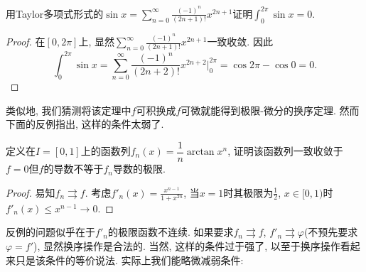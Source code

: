 \begin{example}
	用Taylor多项式形式的$\sin x = \sum_{n=0}^{\infty} \frac{(-1)^n}{(2n+1)!}x^{2n+1}$证明$\int_0^{2\pi} \sin x = 0$. 
\end{example}
\begin{proof}
	在$[0,2\pi]$上, 显然$\sum_{n=0}^{\infty} \frac{(-1)^n}{(2n+1)!}x^{2n+1}$一致收敛. 因此$$\int_0^{2\pi} \sin x = \sum_{n=0}^{\infty} \frac{(-1)^n}{(2n+2)!}x^{2n+2} \big|_0^{2\pi} = \cos 2\pi - \cos 0 = 0.$$
\end{proof}

类似地, 我们猜测将该定理中$f$可积换成$f$可微就能得到极限-微分的换序定理. 然而下面的反例指出, 这样的条件太弱了. 

\begin{example}
	定义在$I=[0,1]$上的函数列$f_n(x)=\dfrac{1}{n}\arctan x^n$, 证明该函数列一致收敛于$f=0$但$f$的导数不等于$f_n$导数的极限. 
\end{example}
\begin{proof}
	易知$f_n \rightrightarrows f$. 考虑$f'_n (x)= \frac{x^{n-1}}{1+x^{2n}}$, 当$x=1$时其极限为$\frac{1}{2}$, $x \in [0,1)$时$f'_n(x) \leq x^{n-1} \to 0$. 
\end{proof}

反例的问题似乎在于$f'_n$的极限函数不连续. 如果要求$f_n \rightrightarrows f$, $f'_n \rightrightarrows \varphi$(不预先要求$\varphi = f'$), 显然换序操作是合法的. 当然, 这样的条件过于强了, 以至于换序操作看起来只是该条件的等价说法. 实际上我们能略微减弱条件: 

